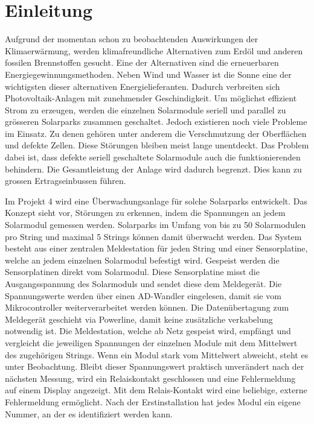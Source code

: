 \section{Einleitung}


Aufgrund der momentan schon zu beobachtenden Auswirkungen der Klimaerwärmung, werden klimafreundliche Alternativen zum Erdöl und anderen fossilen Brennstoffen gesucht. Eine der Alternativen sind die erneuerbaren Energiegewinnungsmethoden. Neben Wind und Wasser ist die Sonne eine der wichtigsten dieser alternativen Energielieferanten. Dadurch verbreiten sich Photovoltaik-Anlagen mit zunehmender Geschindigkeit. Um möglichst effizient Strom zu erzeugen, werden die einzelnen Solarmodule seriell und parallel zu grösseren Solarparks zusammen geschaltet. Jedoch existieren noch viele Probleme im Einsatz. Zu denen gehören unter anderem die Verschmutzung der Oberflächen und defekte Zellen. Diese Störungen bleiben meist lange unentdeckt. Das Problem dabei ist, dass defekte seriell geschaltete Solarmodule auch die funktionierenden behindern. Die Gesamtleistung der Anlage wird dadurch begrenzt. Dies kann zu grossen Ertragseinbussen führen.


Im Projekt 4 wird eine Überwachungsanlage für solche Solarparks entwickelt. Das Konzept sieht vor, Störungen zu erkennen, indem die Spannungen an jedem Solarmodul gemessen werden. Solarparks im Umfang von bis zu 50 Solarmodulen pro String und maximal 5 Strings können damit überwacht werden. Das System besteht aus einer zentralen Meldestation für jeden String und einer Sensorplatine, welche an jedem einzelnen Solarmodul befestigt wird. Gespeist werden die Sensorplatinen direkt vom Solarmodul. Diese Sensorplatine misst die Ausgangsspannung des Solarmoduls und sendet diese dem Meldegerät. Die Spannungswerte werden über einen AD-Wandler eingelesen, damit sie vom Mikrocontroller weiterverarbeitet werden können. Die Datenübertagung zum Meldegerät geschieht via Powerline, damit keine zusätzliche verkabelung notwendig ist. Die Meldestation, welche ab Netz gespeist wird, empfängt und vergleicht die jeweiligen Spannungen der einzelnen Module mit dem Mittelwert des zugehörigen Strings. Wenn ein Modul stark vom Mittelwert abweicht, steht es unter Beobachtung. Bleibt dieser Spannungswert praktisch unverändert nach der nächsten Messung, wird ein Relaiskontakt geschlossen und eine Fehlermeldung auf einem Display angezeigt. Mit dem Relais-Kontakt wird eine beliebige, externe Fehlermeldung ermöglicht. Nach der Erstinstallation hat jedes Modul ein eigene Nummer, an der es identifiziert werden kann.
